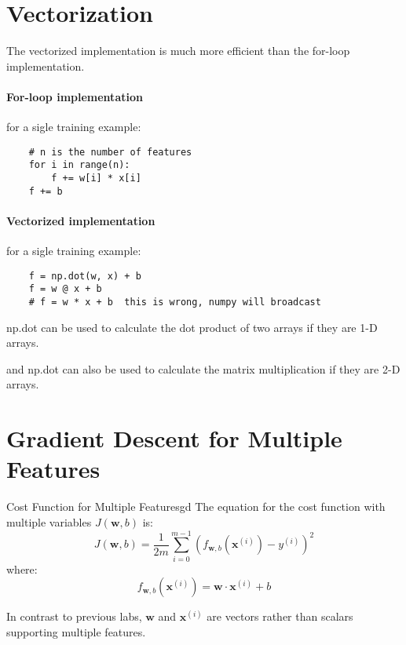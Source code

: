 \section{Vectorization}
The vectorized implementation is much more efficient than the for-loop implementation.
\paragraph*{For-loop implementation}
for a sigle training example:
\begin{verbatim}
    # n is the number of features
    for i in range(n):
        f += w[i] * x[i]
    f += b
\end{verbatim}
\paragraph*{Vectorized implementation}
for a sigle training example:
\begin{verbatim}
    f = np.dot(w, x) + b
    f = w @ x + b
    # f = w * x + b  this is wrong, numpy will broadcast
\end{verbatim}
\begin{notebox}
    np.dot can be used to calculate the dot product of two arrays if they are 1-D arrays.\par
    and np.dot can also be used to calculate the matrix multiplication if they are 2-D arrays.
\end{notebox}

\section{Gradient Descent for Multiple Features}
\begin{dfnbox}{Cost Function for Multiple Features}{gd}
    The equation for the cost function with multiple variables $J(\mathbf{w},b)$ is:
    \begin{equation}
        J(\mathbf{w},b) = \frac{1}{2m} \sum\limits_{i = 0}^{m-1} (f_{\mathbf{w},b}(\mathbf{x}^{(i)}) - y^{(i)})^2
    \end{equation}
    where:
    \begin{equation}
    f_{\mathbf{w},b}(\mathbf{x}^{(i)}) = \mathbf{w} \cdot \mathbf{x}^{(i)} + b
    \end{equation}
    
    In contrast to previous labs, $\mathbf{w}$ and $\mathbf{x}^{(i)}$ are vectors rather than scalars supporting multiple features.
\end{dfnbox}

